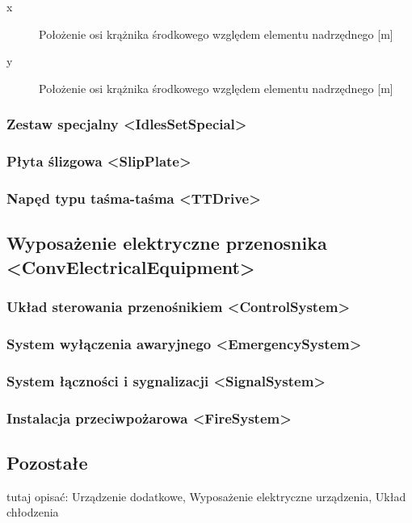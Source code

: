 \documentclass[12pt,a4paper]{article}
\begin{document}
\begin{description}
\item[x] Położenie osi krążnika środkowego względem elementu nadrzędnego [m]
\item[y] Położenie osi krążnika środkowego względem elementu nadrzędnego [m]
\end{description}


\subsubsection{Zestaw specjalny <IdlesSetSpecial>}


\subsubsection{Płyta ślizgowa <SlipPlate>}


\subsubsection{Napęd typu taśma-taśma <TTDrive>}


\subsection{Wyposażenie elektryczne przenosnika <ConvElectricalEquipment>}


\subsubsection{Układ sterowania przenośnikiem <ControlSystem>}


\subsubsection{System wyłączenia awaryjnego <EmergencySystem>}


\subsubsection{System łączności i sygnalizacji <SignalSystem>}


\subsubsection{Instalacja przeciwpożarowa <FireSystem>}


\subsection{Pozostałe}
tutaj opisać: Urządzenie dodatkowe, Wyposażenie elektryczne urządzenia, Układ
chłodzenia
\end{document}
